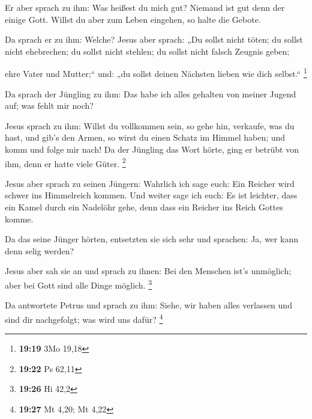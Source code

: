  Er aber sprach zu ihm: Was heißest du mich gut? Niemand
ist gut denn der einige Gott. Willst du aber zum Leben eingehen, so
halte die Gebote.

 Da sprach er zu ihm: Welche? Jesus aber sprach: „Du
sollst nicht töten; du sollst nicht ehebrechen; du sollst nicht stehlen;
du sollst nicht falsch Zeugnis geben;

 ehre Vater und Mutter;`` und: „du sollst deinen Nächsten
lieben wie dich selbst.`` \footnote{\textbf{19:19} 3Mo 19,18}

 Da sprach der Jüngling zu ihm: Das habe ich alles
gehalten von meiner Jugend auf; was fehlt mir noch?

 Jesus sprach zu ihm: Willst du vollkommen sein, so gehe
hin, verkaufe, was du hast, und gib's den Armen, so wirst du einen
Schatz im Himmel haben; und komm und folge mir nach!  Da
der Jüngling das Wort hörte, ging er betrübt von ihm, denn er hatte
viele Güter. \footnote{\textbf{19:22} Ps 62,11}

 Jesus aber sprach zu seinen Jüngern: Wahrlich ich sage
euch: Ein Reicher wird schwer ins Himmelreich kommen. 
Und weiter sage ich euch: Es ist leichter, dass ein Kamel durch ein
Nadelöhr gehe, denn dass ein Reicher ins Reich Gottes komme.

 Da das seine Jünger hörten, entsetzten sie sich sehr und
sprachen: Ja, wer kann denn selig werden?

 Jesus aber sah sie an und sprach zu ihnen: Bei den
Menschen ist's unmöglich; aber bei Gott sind alle Dinge möglich.
\footnote{\textbf{19:26} Hi 42,2}

 Da antwortete Petrus und sprach zu ihm: Siehe, wir haben
alles verlassen und sind dir nachgefolgt; was wird uns dafür?
\footnote{\textbf{19:27} Mt 4,20; Mt 4,22}


